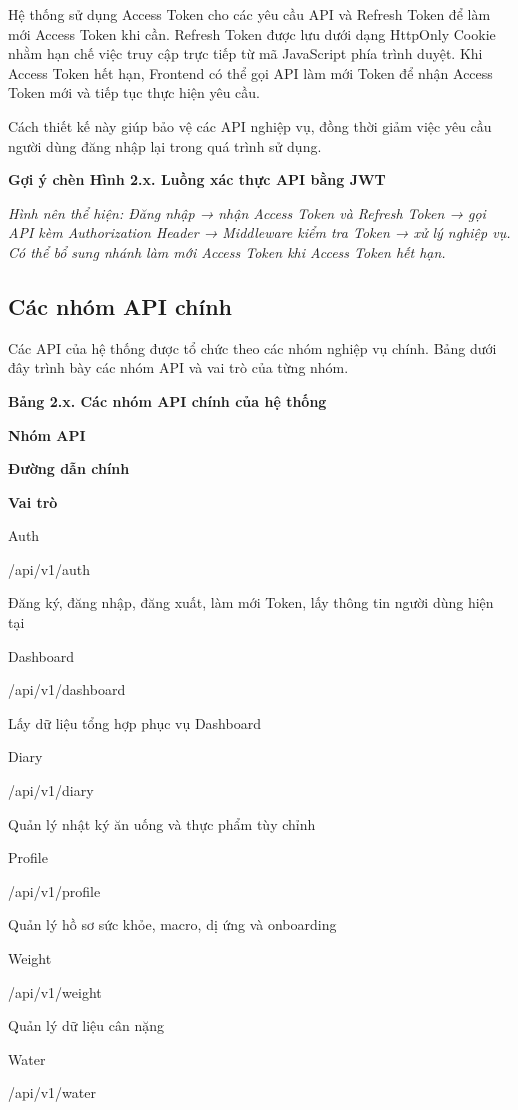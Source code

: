 \documentclass[12pt, a4paper]{report}
\begin{document}
Hệ thống sử dụng Access Token cho các yêu cầu API và Refresh Token để làm mới Access Token khi cần. Refresh Token được lưu dưới dạng HttpOnly Cookie nhằm hạn chế việc truy cập trực tiếp từ mã JavaScript phía trình duyệt. Khi Access Token hết hạn, Frontend có thể gọi API làm mới Token để nhận Access Token mới và tiếp tục thực hiện yêu cầu.

Cách thiết kế này giúp bảo vệ các API nghiệp vụ, đồng thời giảm việc yêu cầu người dùng đăng nhập lại trong quá trình sử dụng.

\textbf{Gợi ý chèn Hình 2.x. Luồng xác thực API bằng JWT}

\textit{Hình nên thể hiện: Đăng nhập → nhận Access Token và Refresh Token → gọi API kèm Authorization Header → Middleware kiểm tra Token → xử lý nghiệp vụ. Có thể bổ sung nhánh làm mới Access Token khi Access Token hết hạn.}

\subsection{Các nhóm API chính}Các API của hệ thống được tổ chức theo các nhóm nghiệp vụ chính. Bảng dưới đây trình bày các nhóm API và vai trò của từng nhóm.

\textbf{Bảng 2.x. Các nhóm API chính của hệ thống}

\textbf{Nhóm API}

\textbf{Đường dẫn chính}

\textbf{Vai trò}

Auth

/api/v1/auth

Đăng ký, đăng nhập, đăng xuất, làm mới Token, lấy thông tin người dùng hiện tại

Dashboard

/api/v1/dashboard

Lấy dữ liệu tổng hợp phục vụ Dashboard

Diary

/api/v1/diary

Quản lý nhật ký ăn uống và thực phẩm tùy chỉnh

Profile

/api/v1/profile

Quản lý hồ sơ sức khỏe, macro, dị ứng và onboarding

Weight

/api/v1/weight

Quản lý dữ liệu cân nặng

Water

/api/v1/water
\end{document}
